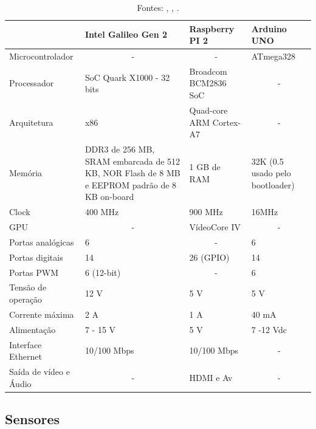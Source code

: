 \begin{table}[H]
\centering
\begin{tabular}{p{3cm}|p{3cm}|p{3cm}|p{3cm}|}
\cline{2-4}
 & Intel Galileo Gen 2 & Raspberry PI 2 & Arduino UNO \\ \hline
\multicolumn{1}{|l|}{Microcontrolador} & \multicolumn{1}{c|}{-} & \multicolumn{1}{c|}{-} & ATmega328 \\ \hline
\multicolumn{1}{|l|}{Processador} & SoC Quark X1000 - 32 bits & Broadcom BCM2836 SoC & \multicolumn{1}{c|}{-} \\ \hline
\multicolumn{1}{|l|}{Arquitetura} & x86 & Quad-core ARM Cortex-A7 & \multicolumn{1}{c|}{-} \\ \hline
\multicolumn{1}{|l|}{Memória} & DDR3 de 256 MB, SRAM embarcada de 512 KB, NOR Flash de 8 MB e EEPROM padrão de 8 KB on-board & 1 GB de RAM & 32K (0.5 usado pelo bootloader) \\ \hline
\multicolumn{1}{|l|}{Clock} & 400 MHz & 900 MHz & 16MHz \\ \hline
\multicolumn{1}{|l|}{GPU} & \multicolumn{1}{c|}{-} & VídeoCore IV & \multicolumn{1}{c|}{-} \\ \hline
\multicolumn{1}{|l|}{Portas analógicas} & 6 & \multicolumn{1}{c|}{-} & 6 \\ \hline
\multicolumn{1}{|l|}{Portas digitais} & 14 & 26 (GPIO) & 14 \\ \hline
\multicolumn{1}{|l|}{Portas PWM} & 6 (12-bit) & \multicolumn{1}{c|}{-} & 6 \\ \hline
\multicolumn{1}{|l|}{Tensão de operação} & 12 V & 5 V & 5 V \\ \hline
\multicolumn{1}{|l|}{Corrente máxima} & 2 A & 1 A & 40 mA \\ \hline
\multicolumn{1}{|l|}{Alimentação} & 7 - 15 V & 5 V & 7 -12 Vdc \\ \hline
\multicolumn{1}{|l|}{Interface Ethernet} & 10/100 Mbps & 10/100 Mbps & \multicolumn{1}{c|}{-} \\ \hline
\multicolumn{1}{|l|}{Saída de vídeo e Áudio} & \multicolumn{1}{c|}{-} & HDMI e Av & \multicolumn{1}{c|}{-} \\ \hline
\end{tabular}
\caption{Fontes: \cite{intelGalileo}, \cite{rsppi}, \cite{arduino}.}
\label{table:microprocessadores}
\end{table}

\subsection{Sensores}

